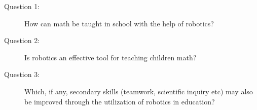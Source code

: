 \begin{description}
	\item[Question 1: ] How can math be taught in school with the help of robotics?
	\item[Question 2: ] Is robotics an effective tool for teaching children math?
	\item[Question 3: ] Which, if any, secondary skills (teamwork, scientific inquiry etc) may also be improved through the utilization of robotics in education?
\end{description}

